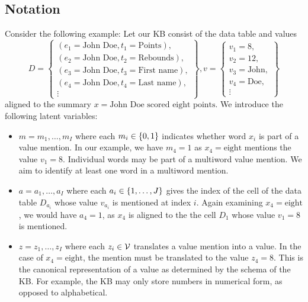 \documentclass[12pt]{article}
\begin{document}
\subsection{Notation}
Consider the following example:
Let our KB consist of the data table and values
$$
D = \left\{\begin{array}{c}
    (e_1 = \textrm{John Doe}, t_1 = \textrm{Points}), \\
    (e_2 = \textrm{John Doe}, t_2 = \textrm{Rebounds}), \\
    (e_3 = \textrm{John Doe}, t_3 = \textrm{First name}),\\
    (e_4 = \textrm{John Doe}, t_4 = \textrm{Last name}), \\
    \vdots
\end{array}\right\},
v = \left\{\begin{array}{c}
v_1 = 8,\\
v_2 = 12,\\
v_3 = \textrm{John},\\
v_4 = \textrm{Doe},\\
\vdots 
\end{array}\right\}
$$
aligned to the summary $x = \textrm{John Doe scored eight points}$.
We introduce the following latent variables:
\begin{itemize}
\item $m = m_1, \ldots, m_I$ where each $m_i \in \left\{0,1\right\}$
    indicates whether word $x_i$ is part of a value mention.
    In our example, we have $m_4 = 1$ as $x_4 = \textrm{eight}$
    mentions the value $v_1 = 8$.
    Individual words may be part of a multiword value mention.
    We aim to identify at least one word in a multiword mention.
\item $a = a_1, \ldots, a_I$ where each $a_i \in \left\{1, \ldots, J\right\}$
    gives the index of the cell of the data table $D_{a_i}$ whose
    value $v_{a_i}$ is mentioned at index $i$.
    Again examining $x_4 = \textrm{eight}$, we would have 
    $a_4 = 1$, as $x_4$ is aligned to the the cell $D_{1}$
    whose value $v_1 = 8$ is mentioned.
\item $z = z_1, \ldots, z_I$ where each $z_i \in \mathcal{V}$
    translates a value mention into a value.
    In the case of $x_4 = \textrm{eight}$, the mention must
    be translated to the value $z_4 = 8$.
    This is the canonical representation of
    a value as determined by the schema of the KB.
    For example, the KB may only store numbers in numerical form,
    as opposed to alphabetical.
\end{itemize}
\end{document}
